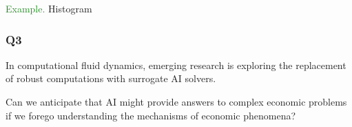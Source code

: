 \documentclass[
    xcolor={svgnames,dvipsnames},
    hyperref={colorlinks, citecolor=DeepPink4, linkcolor=DarkRed, urlcolor=DarkBlue}
    ]{beamer}  %
\newcommand{\Eg}{\textcolor{ForestGreen}{Example. }}
\newcommand{\1}{\mathbbm 1}
\begin{document}
\begin{frame}
    
    
    \Eg Histogram

    \begin{figure}
        \centering
    \end{figure}


\end{frame}


\begin{frame}
    \frametitle{Q3}
    
    In computational fluid dynamics, emerging research is exploring the
    replacement of robust computations with surrogate AI solvers. 

            \vspace{0.3em}
            \vspace{0.3em}
            \vspace{0.3em}
            \vspace{0.3em}
            \vspace{0.3em}
    Can we anticipate that AI might provide answers to complex economic
    problems if we forego understanding the mechanisms of economic phenomena?

\end{frame}
\end{document}
